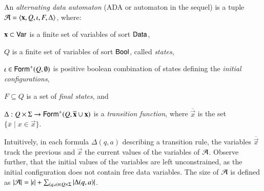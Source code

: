 \documentclass[10pt,conference,letterpaper,twocolumn]{IEEEtran}
\begin{document}
An \emph{alternating data automaton} (ADA or automaton in the sequel)
is a tuple $\mathcal{A} = \left\langle \mathbf x,Q,\iota,F,\Delta \right\rangle$,
where: \begin{compactitem}
%
\item $\mathbf x \subset \mathsf{Var}$ is a finite set of variables of sort
  $\mathsf{Data}$,
%
\item $Q$ is a finite set of variables of sort $\mathsf{Bool}$, called
  \emph{states},
%
\item $\iota \in \mathsf{Form}^+(Q,\emptyset)$ is positive boolean combination
  of states defining the \emph{initial configurations},
%
\item $F \subseteq Q$ is a set of \emph{final states}, and
%
\item $\Delta : Q \times \Sigma \rightarrow
  \mathsf{Form}^+(Q,\overline{\mathbf x}\cup\mathbf x)$ is a \emph{transition
    function}, where $\overline{\vec{x}}$ is the set $\{\overline{x}
  \mid x \in \vec{x}\}$.
\end{compactitem}
Intuitively, in each formula $\Delta(q,a)$ describing a transition
rule, the variables $\overline{\vec{x}}$ track the previous and
$\vec{x}$ the current values of the variables of $\mathcal{A}$. Observe
further, that the initial values of the variables are left
unconstrained, as the initial configuration does not contain free
data variables. The size of $\mathcal{A}$ is defined as ${|{\mathcal{A}}|} = {|{\iota}|}
+ \sum_{(q,a) \in Q\times\Sigma}{|{\Delta(q,a)}|}$.
\end{document}
